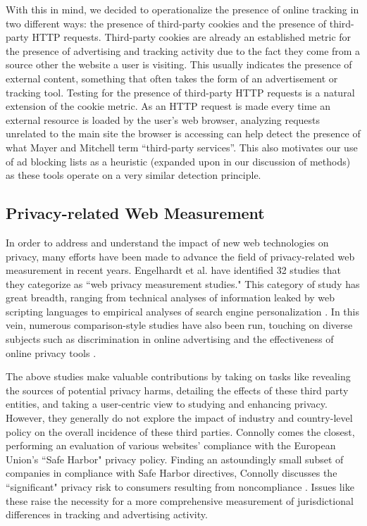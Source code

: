 \documentclass[conference]{IEEEtran}
\begin{document}
With this in mind, we decided to operationalize the presence of online tracking in two different ways: the presence of third-party cookies and the presence of third-party HTTP requests. Third-party cookies are already an established metric for the presence of advertising and tracking activity due to the fact they come from a source other the website a user is visiting. This usually indicates the presence of external content, something that often takes the form of an advertisement or tracking tool\cite{Mayer_Mitchell}. Testing for the presence of third-party HTTP requests is a natural extension of the cookie metric. As an HTTP request is made every time an external resource is loaded by the user’s web browser, analyzing requests unrelated to the main site the browser is accessing can help detect the presence of what Mayer and Mitchell term ``third-party services''\cite{Mayer_Mitchell}. This also motivates our use of ad blocking lists as a heuristic (expanded upon in our discussion of methods) as these tools operate on a very similar detection principle.

\subsection{Privacy-related Web Measurement}
In order to address and understand the impact of new web technologies on privacy, many efforts have been made to advance the field of privacy-related web measurement in recent years. Engelhardt et al. \cite{openwpm_article} have identified 32 studies that they categorize as ``web privacy measurement studies." This category of study has great breadth, ranging from technical analyses of information leaked by web scripting languages \cite{jang} to empirical analyses of search engine personalization \cite{hannak}.  In this vein, numerous comparison-style studies have also been run, touching on diverse subjects such as discrimination in online advertising \cite{sweeney} and the effectiveness of online privacy tools \cite{balebako}.

The above studies make valuable contributions by taking on tasks like revealing the sources of potential privacy harms, detailing the effects of these third party entities, and taking a user-centric view to studying and enhancing privacy. However, they generally do not explore the impact of industry and country-level policy on the overall incidence of these third parties. Connolly comes the closest, performing an evaluation of various websites' compliance with the European Union's ``Safe Harbor" privacy policy. Finding an astoundingly small subset of companies in compliance with Safe Harbor directives, Connolly discusses the ``significant" privacy risk to consumers resulting from noncompliance   \cite{connolly}. Issues like these raise the necessity for a more comprehensive measurement of jurisdictional differences in tracking and advertising activity.
\end{document}
